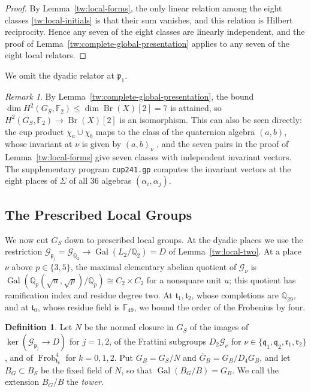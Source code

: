 \documentclass[11pt]{amsart}
\numberwithin{equation}{section}
\theoremstyle{definition}
\newtheorem{definition}[equation]{Definition}
\theoremstyle{remark}
\newtheorem{remark}[equation]{Remark}
\DeclareMathOperator{\Gal}{Gal}
\DeclareMathOperator{\Br}{Br}
\DeclareMathOperator{\Frob}{Frob}
\newcommand{\Ftwo}{\mathbb F_2}
\newcommand{\Q}{\mathbb Q}
\begin{document}
\begin{proof}
By Lemma~\ref{tw:local-forms}, the only linear relation among the eight
classes \eqref{tw:local-initials} is that their sum vanishes, and this
relation is Hilbert reciprocity. Hence any seven of the eight classes are
linearly independent, and the proof of
Lemma~\ref{tw:complete-global-presentation} applies to any seven of the eight
local relators.
\end{proof}

We omit the dyadic relator at $\mathfrak p_1$.

\begin{remark}\label{tw:cup-remark}
By Lemma~\ref{tw:complete-global-presentation}, the bound
$\dim H^2(G_S,\Ftwo)\le\dim\Br(X)[2]=7$ is attained, so
$H^2(G_S,\Ftwo)\to\Br(X)[2]$ is an isomorphism. This can also be seen
directly: the cup product
$\chi_a\cup\chi_b$ maps to the class of the quaternion algebra $(a,b)$, whose
invariant at $\nu$ is given by $(a,b)_\nu$ \cite[Chapter~III,
Remark~4.7]{MilneCFT}, and the seven pairs in the proof of
Lemma~\ref{tw:local-forms} give seven classes with independent invariant
vectors. The supplementary program \texttt{cup241.gp} computes the invariant
vectors at the eight places of $\Sigma$ of all $36$ algebras
$(\alpha_i,\alpha_j)$.
\end{remark}

\subsection{The Prescribed Local Groups}\label{tw:prescribed-section}
We now cut $G_S$ down to prescribed local groups. At the dyadic
places we use the restriction
$\mathcal G_{\mathfrak p_j}=\mathcal G_{\Q_2}\to\Gal(L_2/\Q_2)=D$ of
Lemma~\ref{tw:local-two}. At a place $\nu$ above $p\in\{3,5\}$, the maximal
elementary abelian quotient of $\mathcal G_\nu$ is
$\Gal(\Q_p(\sqrt u,\sqrt p)/\Q_p)\cong C_2\times C_2$ for a nonsquare unit $u$;
this quotient has ramification index and residue degree two. At
$\mathfrak t_1,\mathfrak t_2$, whose completions are $\Q_{29}$, and at
$\mathfrak t_0$, whose residue field is $\mathbb F_{49}$, we bound the order
of the Frobenius by four.

\begin{definition}\label{tw:GB}
Let $N$ be the normal closure in $G_S$ of the images of
$\ker(\mathcal G_{\mathfrak p_j}\to D)$ for $j=1,2$, of the Frattini subgroups
$D_2\mathcal G_\nu$ for $\nu\in\{\mathfrak q_1,\mathfrak q_2,\mathfrak r_1,\mathfrak r_2\}$,
and of $\Frob_{\mathfrak t_k}^4$ for $k=0,1,2$. Put $G_B=G_S/N$ and
$\overline G_B=G_B/D_4G_B$, and let $B_G\subset B_S$ be the fixed field of
$N$, so that $\Gal(B_G/B)=G_B$. We call the extension $B_G/B$ the
\emph{tower}.
\end{definition}
\end{document}
